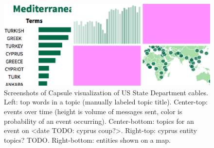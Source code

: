 \begin{figure}
\centering
\includegraphics[width=\linewidth]{fig/viz.png}
\caption{Screenshots of Capsule visualization of US State Department cables.  Left: top words in a topic (manually labeled topic title).  Center-top: events over time (height is volume of messages sent, color is probability of an event occurring).  Center-bottom: topics for an event on <date TODO: cyprus coup?>.  Right-top: cyprus entity topics? TODO.  Right-bottom: entities shown on a map.}
\label{fig:viz}
\end{figure}
